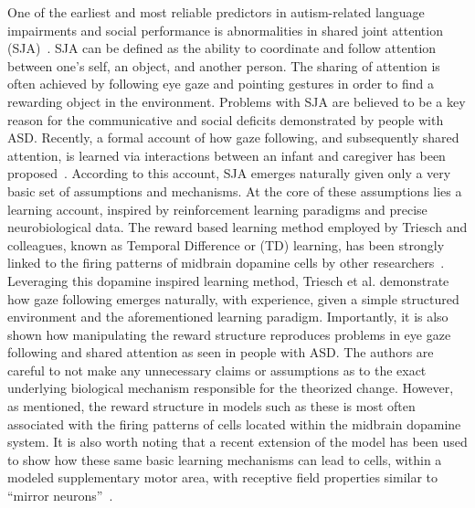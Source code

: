 
One of the earliest and most reliable predictors in autism-related language impairments and social performance is abnormalities in shared joint attention (SJA)~\cite{RefWorks:163}. SJA can be defined as the ability to coordinate and follow attention between one's self, an object, and another person. The sharing of attention is often achieved by following eye gaze and pointing gestures in order to find a rewarding object in the environment. Problems with SJA are believed to be a key reason for the communicative and social deficits demonstrated by people with ASD. Recently, a formal account of how gaze following, and subsequently shared attention, is learned via interactions between an infant and caregiver has been proposed~\cite{RefWorks:77}. According to this account, SJA emerges naturally given only a very basic set of assumptions and mechanisms. At the core of these assumptions lies a learning account, inspired by reinforcement learning paradigms and precise neurobiological data. The reward based learning method employed by Triesch and colleagues, known as Temporal Difference or (TD) learning, has been strongly linked to the firing patterns of midbrain dopamine cells by other researchers~\cite{BartoAG:1994:TDLearning,MontaguePR:1996:Dopamine}. Leveraging this dopamine inspired learning method, Triesch et al. demonstrate how gaze following emerges naturally, with experience, given a simple structured environment and the aforementioned learning paradigm. Importantly, it is also shown how manipulating the reward structure reproduces problems in eye gaze following and shared attention as seen in people with ASD. The authors are careful to not make any unnecessary claims or assumptions as to the exact underlying biological  mechanism responsible for the theorized change.  However, as mentioned, the reward structure in models such as these is most often associated with the firing patterns of cells located within the midbrain dopamine system.  It is also worth noting that a recent extension of the model has been used to show how these same basic learning mechanisms can lead to cells, within a modeled supplementary motor area, with receptive field properties similar to ``mirror neurons''~\cite{RefWorks:91}.  

